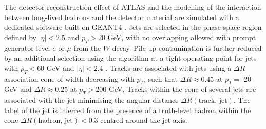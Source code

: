 The detector reconstruction effect of ATLAS and the modelling of the interaction between long-lived hadrons and the detector material are simulated with a dedicated software \cite{ATLASSimulationInfra} built on GEANT4 \cite{Agostinelli:602040}. Jets are selected in the phase space region defined by $|\eta| < 2.5$ and $p_T > 20$ GeV, with no overlapping allowed with prompt generator-level $e$ or $\mu$ from the $W$ decay. Pile-up contamination is further reduced by an additional selection using the  algorithm at a tight operating point for jets with $p_T < 60$ GeV and $|\eta| < 2.4$ \cite{ATLAS-CONF-2014-018}. Tracks are associated with jets using a $\Delta R$ association cone of width decreasing with $p_T$, such that $\Delta R \approx 0.45$ at $p_T =$ 20 GeV and $\Delta R \approx 0.25$ at $p_T > 200$ GeV. Tracks within the cone of several jets are associated with the jet minimising the angular distance $\Delta R(\textrm{track, jet})$. The label of the jet is inferred from the presence of a truth-level hadron within the cone $\Delta R(\textrm{hadron, jet}) < 0.3$ centred around the jet axis.

